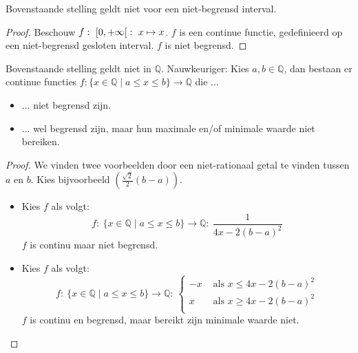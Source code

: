 \documentclass[main.tex]{subfiles}
\begin{document}
\begin{tvb}
  Bovenstaande stelling geldt niet voor een niet-begrensd interval.

  \begin{proof}
    Beschouw $f:\ \interval[open right]{0}{+\infty}:\ x \mapsto x$.
    $f$ is een continue functie, gedefinieerd op een niet-begrensd gesloten interval.
    $f$ is niet begrensd.
  \end{proof}
\end{tvb}

\begin{tvb}
  Bovenstaande stelling geldt niet in $\mathbb{Q}$.
  Nauwkeuriger: Kies $a,b \in \mathbb{Q}$, dan bestaan er continue functies $f: \{ x \in \mathbb{Q} \mid a \le x \le b \} \rightarrow \mathbb{Q} $ die ...
  \begin{itemize}
  \item ... niet begrensd zijn.
  \item ... wel begrensd zijn, maar hun maximale en/of minimale waarde niet bereiken.
  \end{itemize}

  \begin{proof}
    We vinden twee voorbeelden door een niet-rationaal getal te vinden tussen $a$ en $b$.
    Kies bijvoorbeeld $\left( \frac{\sqrt{2}}{2}(b-a) \right)$.
    \begin{itemize}
    \item Kies $f$ als volgt: 
      \[
      f:\ \{ x \in \mathbb{Q} \mid a \le x \le b \} \rightarrow \mathbb{Q}:\ 
      \frac{1}{4x-2(b-a)^{2}}
      \]
      $f$ is continu maar niet begrensd.
    \item Kies $f$ als volgt:
      \[
      f:\ \{ x \in \mathbb{Q} \mid a \le x \le b \} \rightarrow \mathbb{Q}:\ 
      \left\{
        \begin{array}{rl}
          -x & \text{ als } x \le  4x-2(b-a)^{2}\\
          x & \text{ als } x \ge  4x-2(b-a)^{2}\\
        \end{array}
      \right.
      \]
      $f$ is continu en begrensd, maar bereikt zijn minimale waarde niet.
    \end{itemize}
  \end{proof}
\end{tvb}
\end{document}
